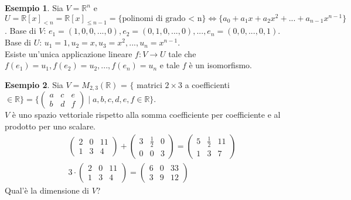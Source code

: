 \documentclass[a4paper]{article}
\theoremstyle{definition}
\newtheorem*{es}{Esempio}
\begin{document}
\begin{es}
	Sia $V = \mathbb{R}^n$ e $U = \mathbb{R}[x]_{<n} = \mathbb{R}[x]_{\leq n - 1} = \{\text{polinomi di grado < n}\} \Leftrightarrow \{a_0 + a_1x + a_2x^2 + ... + a_{n - 1}x^{n - 1}\}$.
	Base di $V$: $e_1 = (1, 0, 0, ..., 0), e_2 = (0, 1, 0, ..., 0), ..., e_n = (0, 0, ..., 0, 1)$. \\
	Base di $U$: $u_1 = 1, u_2 = x, u_3 = x^2, ..., u_n = x^{n - 1}$. \\
	Esiste un'unica applicazione lineare $f: V \rightarrow U$ tale che $f(e_1) = u_1, f(e_2) = u_2, ..., f(e_n) = u_n$ e tale $f$ è un isomorfismo.
\end{es}
\begin{es}
	Sia $V = M_{2, 3}(\mathbb{R})$ = $\{$ matrici $2 \times 3$ a coefficienti $\in \mathbb{R}\}
		= \{\begin{pmatrix} a & c & e \\ b & d & f \end{pmatrix} \mid a, b, c, d, e, f \in \mathbb{R}\}$. \\
	$V$ è uno spazio vettoriale rispetto alla somma coefficiente per coefficiente e al prodotto per uno scalare. \\
	\begin{align*}
		\begin{pmatrix}
			2 & 0 & 11 \\
			1 & 3 & 4
		\end{pmatrix} + \begin{pmatrix}
			                3 & \frac{1}{2} & 0 \\
			                0 & 0           & 3
		                \end{pmatrix} = \begin{pmatrix}
			                                5 & \frac{1}{2} & 11 \\
			                                1 & 3           & 7
		                                \end{pmatrix} \\
		3 \cdot \begin{pmatrix}
			        2 & 0 & 11 \\
			        1 & 3 & 4
		        \end{pmatrix} = \begin{pmatrix}
			                        6 & 0 & 33 \\
			                        3 & 9 & 12
		                        \end{pmatrix}
	\end{align*}
	Qual'è la dimensione di $V$? \\

\end{es}
\end{document}
